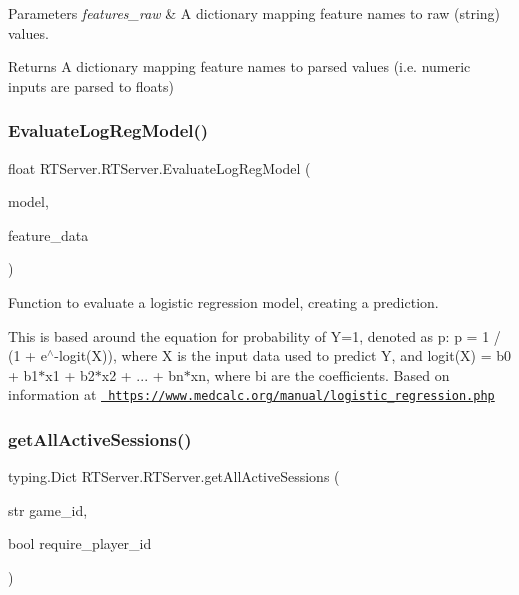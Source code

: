 \begin{DoxyParams}{Parameters}
{\em features\+\_\+raw} & A dictionary mapping feature names to raw (string) values. \\
\hline
\end{DoxyParams}
\begin{DoxyReturn}{Returns}
A dictionary mapping feature names to parsed values (i.\+e. numeric inputs are parsed to floats) 
\end{DoxyReturn}
\mbox{\label{class_r_t_server_1_1_r_t_server_a4a3465a37859b43a764b131725087740}} 
\subsubsection{\texorpdfstring{EvaluateLogRegModel()}{EvaluateLogRegModel()}}
{\footnotesize\ttfamily  float R\+T\+Server.\+R\+T\+Server.\+Evaluate\+Log\+Reg\+Model (\begin{DoxyParamCaption}\item[{}]{model,  }\item[{}]{feature\+\_\+data }\end{DoxyParamCaption})\hspace{0.3cm}{\ttfamily [static]}}



Function to evaluate a logistic regression model, creating a prediction. 

This is based around the equation for probability of Y=1, denoted as p\+: p = 1 / (1 + e$^\wedge$-\/logit(X)), where X is the input data used to predict Y, and logit(\+X) = b0 + b1$\ast$x1 + b2$\ast$x2 + ... + bn$\ast$xn, where bi are the coefficients. Based on information at \href{https://www.medcalc.org/manual/logistic_regression.php}{\texttt{ https\+://www.\+medcalc.\+org/manual/logistic\+\_\+regression.\+php}} \mbox{\label{class_r_t_server_1_1_r_t_server_a36d42dbd33f9a79872c66c332a6d5591}} 
\subsubsection{\texorpdfstring{getAllActiveSessions()}{getAllActiveSessions()}}
{\footnotesize\ttfamily  typing.\+Dict R\+T\+Server.\+R\+T\+Server.\+get\+All\+Active\+Sessions (\begin{DoxyParamCaption}\item[{str}]{game\+\_\+id,  }\item[{bool}]{require\+\_\+player\+\_\+id }\end{DoxyParamCaption})\hspace{0.3cm}{\ttfamily [static]}}



